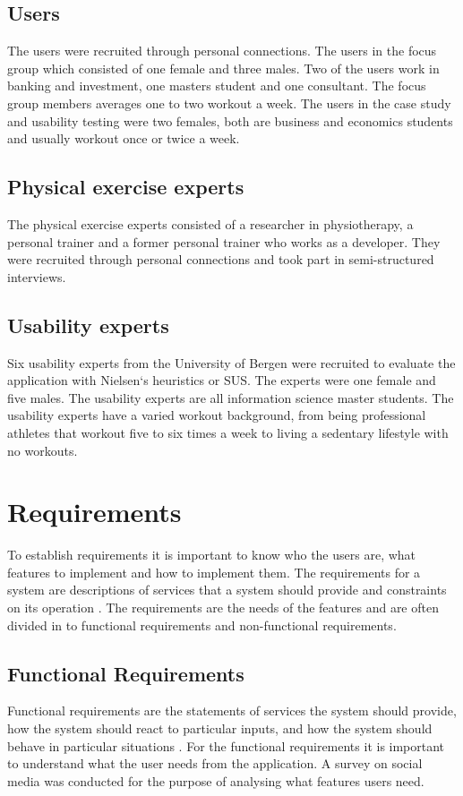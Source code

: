 \subsection{Users}
The users were recruited through personal connections. The users in the focus group which consisted of  one female and three males. Two of the users work in banking and investment, one masters student and one consultant. The focus group members averages one to two workout a week. 
The users in the case study and usability testing were two females, both are business and economics students and usually workout once or twice a week.
\subsection{Physical exercise experts}
The physical exercise experts consisted of a researcher in physiotherapy, a personal trainer and a former personal trainer who works as a developer. They were recruited through personal connections and took part in semi-structured interviews.
\subsection{Usability experts}
Six usability experts from the University of Bergen were recruited to evaluate the application with  Nielsen`s heuristics or SUS. The experts were one female and five males. The usability experts are all information science master students. The usability experts have a varied workout background, from being professional athletes that workout five to six times a week to living a sedentary lifestyle with no workouts. 
\section{Requirements}\label{requirements}
To establish requirements it is important to know who the users are, what features to implement and how to implement them. The requirements for a system are descriptions of services that a system should provide and constraints on its operation \cite{Sommerville:2010:SE:1841764}. The requirements are the needs of the features and are often divided in to functional requirements and non-functional requirements.
\subsection{Functional Requirements}
Functional requirements are the statements of services the system should provide, how the system should react to particular inputs, and how the system should behave in particular situations \cite{Sommerville:2010:SE:1841764}.
For the functional requirements it is important to understand what the user needs from the application. A survey on social media was conducted for the purpose of analysing what features users need.  

